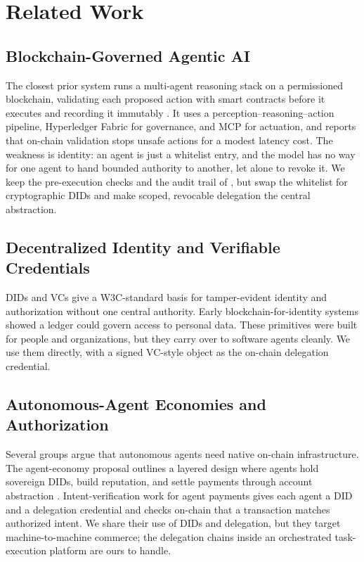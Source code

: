 \documentclass[conference]{IEEEtran}
\begin{document}
\section{Related Work}\label{sec:rel}
\subsection{Blockchain-Governed Agentic AI}
The closest prior system runs a multi-agent reasoning stack on a permissioned blockchain, validating each proposed action with smart contracts before it executes and recording it immutably \cite{jan2025}. It uses a perception--reasoning--action pipeline, Hyperledger Fabric for governance, and MCP for actuation, and reports that on-chain validation stops unsafe actions for a modest latency cost. The weakness is identity: an agent is just a whitelist entry, and the model has no way for one agent to hand bounded authority to another, let alone to revoke it. We keep the pre-execution checks and the audit trail of \cite{jan2025}, but swap the whitelist for cryptographic DIDs and make scoped, revocable delegation the central abstraction.

\subsection{Decentralized Identity and Verifiable Credentials}
DIDs \cite{w3c-did} and VCs \cite{w3c-vc} give a W3C-standard basis for tamper-evident identity and authorization without one central authority. Early blockchain-for-identity systems \cite{zyskind2015} showed a ledger could govern access to personal data. These primitives were built for people and organizations, but they carry over to software agents cleanly. We use them directly, with a signed VC-style object as the on-chain delegation credential.

\subsection{Autonomous-Agent Economies and Authorization}
Several groups argue that autonomous agents need native on-chain infrastructure. The agent-economy proposal \cite{xu2026} outlines a layered design where agents hold sovereign DIDs, build reputation, and settle payments through account abstraction \cite{erc4337}. Intent-verification work for agent payments \cite{tiva2025} gives each agent a DID and a delegation credential and checks on-chain that a transaction matches authorized intent. We share their use of DIDs and delegation, but they target machine-to-machine commerce; the delegation chains inside an orchestrated task-execution platform are ours to handle.
\end{document}
